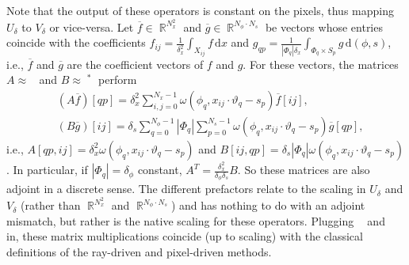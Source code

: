 \documentclass[11pt,reqno]{amsart}
\DeclareMathOperator{\RR}{\mathbb{R}}
\newcommand{\sumx}{\sum_{i,j=0}^{N_x-1}}
\newcommand{\sums}{\sum_{p=0}^{N_s-1}}
\newcommand{\sumphi}{\sum_{q=0}^{N_\phi-1}}
\DeclareMathOperator{\GenRadon}{\mathcal{R}^\omega_{\delta}}
\DeclareMathOperator{\RayWeight}{\omega^\mathrm{rd}_{\delta_\mathit{x}}}
\DeclareMathOperator{\PixelWeight}{\omega^\mathrm{pd}_{\delta_\mathit{s}}}
\newcommand{\dd}[1]{\,\mathrm{d}{#1}}
\numberwithin{theorem}{section}
\theoremstyle{remark}
\begin{document}
 Note that the output of these operators is constant on the pixels, thus mapping $U_\delta$ to $V_\delta$ or vice-versa. Let $\overline f \in \RR^{N_x^2}$ and $\overline g\in \RR^{N_\phi\cdot N_s}$ be vectors whose entries coincide with the coefficients $f_{ij}=\frac{1}{\delta_x^2}\int_{X_{ij}}f \dd x$ and $g_{qp}=\frac{1}{|\Phi_q|\delta_x}\int_{\Phi_q\times S_p}g \dd{(\phi,s)}$, i.e., $\overline{f}$ and $\overline{g}$ are the coefficient vectors of $f$ and $g$. For these vectors, the matrices $A\approx \GenRadon$ and $B\approx \GenRadon^*$ perform
\begin{align} 
&(A \overline f)[{qp}] = \delta_x^2\sumx \omega(\phi_q,x_{ij}\cdot \vartheta_q-s_p) \overline f[{ij}] , \label{equ_def_convolutional_Radon_discrete}
\\
  &(B \overline g)[{ij}] = \delta_s \sumphi |\Phi_q| \sums \omega(\phi_q,x_{ij}\cdot \vartheta_q-s_p) \overline g[{qp}], \label{equ_def_convolutional_backproj_discrete}
\end{align}
i.e., $A[qp,ij]= \delta_x^2  \omega(\phi_q,x_{ij}\cdot \vartheta_q-s_p)$ and $B[ij,qp]= \delta_s |\Phi_q| \omega(\phi_q,x_{ij}\cdot \vartheta_q-s_p)$. In particular, if $|\Phi_q|=\delta_\phi$ constant, $A^T = \frac{\delta_x^2}{\delta_\phi\delta_s} B$. So these matrices are also adjoint in a discrete sense. The different prefactors relate to the scaling in $U_\delta$ and $V_\delta$ (rather than $\RR^{N_x^2}$ and $\RR^{N_\phi \cdot N_s}$) and has nothing to do with an adjoint mismatch, but rather is the native scaling for these operators.
Plugging $\RayWeight$ and $\PixelWeight$ in, these matrix multiplications coincide (up to scaling) with the classical definitions of the ray-driven and pixel-driven methods.
\end{document}
